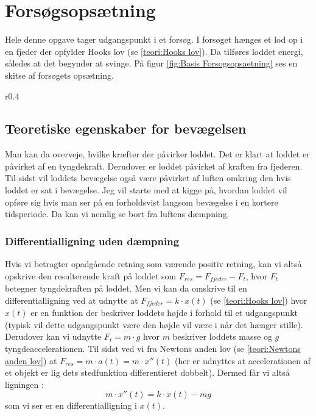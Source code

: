 \section{Forsøgsopsætning}\label{teori: opsatning af differentialligninger}
Hele denne opgave tager udgangspunkt i et forsøg.
I forsøget hænges et lod op i en fjeder der opfylder Hooks lov (se \ref{teori:Hooks lov}). 
Da tilføres loddet energi, således at det begynder at svinge. 
På figur \ref{fig:Basis Forsogsopsaetning} ses en skitse af forsøgets opsætning.

\begin{wrapfigure}{r}{0.4\textwidth}
\centering
{}%

\caption{Skitse af forsøgsopsætning.}
\label{fig:Basis Forsogsopsaetning}
\end{wrapfigure} 

\subsection{Teoretiske egenskaber for bevægelsen}
Man kan da overveje, hvilke kræfter der påvirker loddet. 
Det er klart at loddet er påvirket af en tyngdekraft. 
Derudover er loddet påvirket af kraften fra fjederen.
Til sidst vil loddets bevægelse også være påvirket af luften omkring den hvis loddet er sat i bevægelse. 
Jeg vil starte med at kigge på, hvordan loddet vil opføre sig hvis man ser på en forholdsvist langsom bevægelse i en kortere tidsperiode.
Da kan vi nemlig se bort fra luftens dæmpning. 

\subsubsection{Differentialligning uden dæmpning}\label{teori: Opstilling ligning uden dampning}
Hvis vi betragter opadgående retning som værende positiv retning, kan vi altså opskrive den resulterende kraft på loddet som $F_{res} = F_{fjeder}-F_{t}$, hvor $F_t$ betegner tyngdekraften på loddet. 
Men vi kan da omskrive til en differentialligning ved at udnytte at $F_{fjeder}=k \cdot x(t)$ (se \ref{teori:Hooks lov}) hvor $x(t)$ er en funktion der beskriver loddets højde i forhold til et udgangspunkt (typisk vil dette udgangspunkt være den højde vil være i når det hænger stille). 
Derudover kan vi udnytte $F_{t}=m\cdot g$ hvor $m$ beskriver loddets masse og $g$ tyngdeaccelerationen. 
Til sidst ved vi fra Newtons anden lov (se \ref{teori:Newtons anden lov}) at $F_{res}=m\cdot a(t) = m \cdot x''(t)$ 
(her er udnyttes at accelerationen af et objekt er lig dets stedfunktion differentieret dobbelt). 
Dermed får vi altså ligningen :
$$m\cdot x''(t)=k\cdot x(t)-mg$$ 
som vi ser er en differentialligning i $x(t)$.

